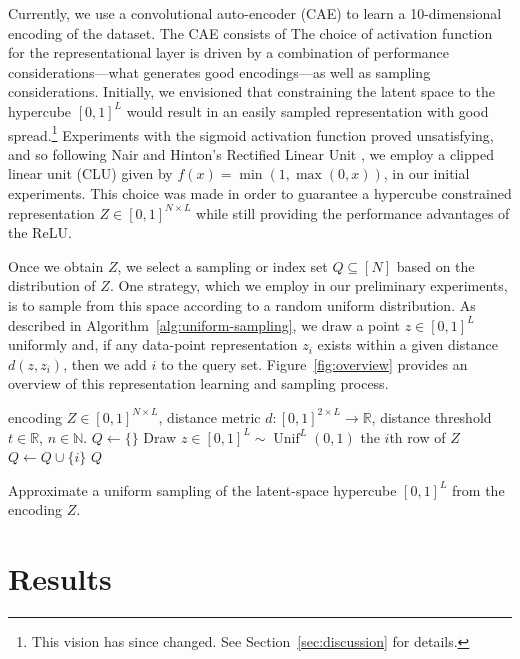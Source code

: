 \documentclass[a4paper]{article}
\DeclareMathOperator{\unif}{Unif}
\begin{document}
Currently, we use a convolutional auto-encoder (CAE) to learn a 10-dimensional
encoding of the dataset. The CAE consists of %
The choice of activation function for the representational layer is driven by a
combination of performance considerations---what generates good encodings---as
well as sampling considerations. Initially, we envisioned that constraining the
latent space to the hypercube $[0,1]^L$ would result in an easily sampled
representation with good spread.\footnote{This vision has since changed. See
  Section~\ref{sec:discussion} for details.} Experiments with the sigmoid
activation function proved unsatisfying, and so following Nair and Hinton's
Rectified Linear Unit \cite{nair_rectified_nodate}, we employ a clipped linear
unit (CLU) given by $f(x) = \min(1, \max(0,x))$, in our initial
experiments. This choice was made in order to guarantee a hypercube constrained
representation $Z \in [0,1]^{N\times L}$ while still providing the performance
advantages of the ReLU.

Once we obtain $Z$, we select a sampling or index set $Q \subseteq [N]$ based on
the distribution of $Z$. One strategy, which we employ in our preliminary
experiments, is to sample from this space according to a random uniform
distribution. As described in Algorithm~\ref{alg:uniform-sampling}, we draw a
point $z \in [0,1]^L$ uniformly and, if any data-point representation $z_i$
exists within a given distance $d(z,z_i)$, then we add $i$ to the query
set. Figure~\ref{fig:overview} provides an overview of this representation
learning and sampling process.

\begin{algorithm}
  \begin{algorithmic}[1]
    \Require encoding $Z \in [0,1]^{N \times L}$, distance metric
    $d : [0,1]^{2 \times L} \rightarrow \mathbb{R}$, distance threshold
    $t \in \mathbb{R}$, $n \in \mathbb{N}$.
    \State $Q \gets \{\}$
    \State Draw $z \in [0,1]^L \sim \unif^L(0,1)$
    \Comment the $i$th row of $Z$
    \State $Q \gets Q \cup \{i\}$
    \EndIf
    \EndFor
    \EndWhile
    \State \Return $Q$
  \end{algorithmic}
  \caption{Approximate a uniform sampling of the latent-space hypercube
    $[0,1]^L$ from the encoding $Z$.}
  \label{alg:uniform-sampling}
\end{algorithm}

\section{Results}
\label{sec:results}
\end{document}

